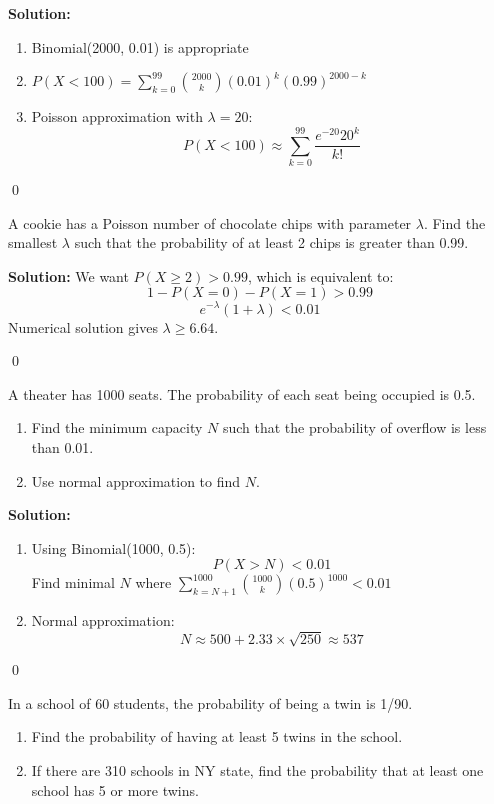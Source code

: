 \noindent\textbf{Solution:}
\begin{enumerate}[label=(\alph*)]
\item Binomial(2000, 0.01) is appropriate
\item \( P(X < 100) = \sum_{k=0}^{99} \binom{2000}{k} (0.01)^k (0.99)^{2000-k} \)
\item Poisson approximation with \( \lambda = 20 \):
\[ P(X < 100) \approx \sum_{k=0}^{99} \frac{e^{-20} 20^k}{k!} \]
\end{enumerate}


\qed
\begin{problembox}
A cookie has a Poisson number of chocolate chips with parameter \( \lambda \). Find the smallest \( \lambda \) such that the probability of at least 2 chips is greater than 0.99.
\end{problembox}

\noindent\textbf{Solution:}
We want \( P(X \geq 2) > 0.99 \), which is equivalent to:
\[ 1 - P(X=0) - P(X=1) > 0.99 \]
\[ e^{-\lambda}(1 + \lambda) < 0.01 \]
Numerical solution gives \( \lambda \geq 6.64 \).


\qed
\begin{problembox}
A theater has 1000 seats. The probability of each seat being occupied is 0.5.
\begin{enumerate}[label=(\alph*)]
\item Find the minimum capacity \( N \) such that the probability of overflow is less than 0.01.
\item Use normal approximation to find \( N \).
\end{enumerate}
\end{problembox}

\noindent\textbf{Solution:}
\begin{enumerate}[label=(\alph*)]
\item Using Binomial(1000, 0.5):
\[ P(X > N) < 0.01 \]
Find minimal \( N \) where \( \sum_{k=N+1}^{1000} \binom{1000}{k} (0.5)^{1000} < 0.01 \)

\item Normal approximation:
\[ N \approx 500 + 2.33 \times \sqrt{250} \approx 537 \]
\end{enumerate}


\qed
\begin{problembox}
In a school of 60 students, the probability of being a twin is 1/90.
\begin{enumerate}[label=(\alph*)]
\item Find the probability of having at least 5 twins in the school.
\item If there are 310 schools in NY state, find the probability that at least one school has 5 or more twins.
\end{enumerate}
\end{problembox}


